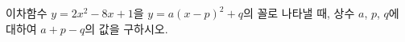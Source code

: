\hspace*{2mm}\begin{minipage}[t]{\dimexpr\linewidth-2mm\relax}\vspace{0pt}
이차함수 $y=2x^2-8x+1$을 $y=a(x-p)^2+q$의 꼴로 나타낼 때, 상수 $a$, $p$, $q$에 대하여 $a+p-q$의 값을 구하시오.\end{minipage}
